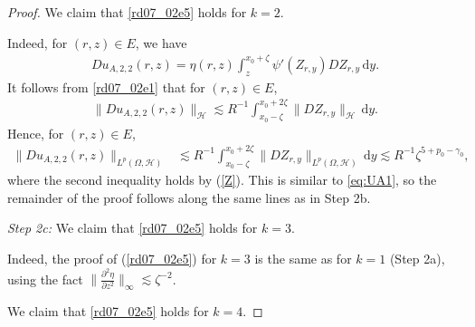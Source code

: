 \documentclass[12pt,a4paper]{article}
\newcommand{\R}{{\mathbb{R}}}
\newcommand{\E}{\mathrm{E}}
\renewcommand{\d}{\mathrm{d}}
\newcommand {\deltah}{{\zeta}}
\newcommand{\<}{\langle}
\renewcommand{\>}{\rangle}
\begin{document}
\begin{proof}
           We claim that \eqref{rd07_02e5} holds for $k=2$.
  
Indeed, for $(r,z)\in E$, we have
           \begin{align*}
           Du_{A,2,2}(r,z) = \eta(r,z) \int_z^{x_0+\deltah} \psi'(Z_{r,y})DZ_{r,y} \, \d y. 
           \end{align*}
           It follows from \eqref{rd07_02e1} that for $(r,z)\in E$,
           \begin{align*}
           \|Du_{A,2,2}(r,z)\|_{\mathcal{H}} \lesssim R^{-1}\int_{x_0-\deltah}^{x_0+2\deltah}\|DZ_{r,y}\|_{\mathcal{H}}\, \d y.
           \end{align*}
           Hence, for $(r,z)\in E$,
           \begin{align*}
           \|Du_{A,2,2}(r,z)\|_{L^p(\Omega,\mathcal{H})}& \lesssim 
           R^{-1}\int_{x_0-\deltah}^{x_0+2\deltah}\|DZ_{r,y}\|_{L^p(\Omega, \mathcal{H})}\, \d y
           \lesssim R^{-1}\deltah^{5+p_0-\gamma_0},
           \end{align*}
           where the second inequality holds by (\ref{Z}). This is similar to \eqref{eq:UA1}, so the remainder of the proof follows along the same lines 
           as in Step 2b.
   \medskip
   
 \noindent
 {\it Step 2c:}
We claim that \eqref{rd07_02e5} holds for $k=3$.
  
 Indeed, the proof of (\ref{rd07_02e5}) for $k=3$ is the same as for $k=1$ (Step 2a), using the fact $\|\frac{\partial^2 \eta}{\partial z^2}\|_\infty\lesssim \deltah^{-2}$.
 
  \medskip
  
           We claim that \eqref{rd07_02e5} holds for $k=4$.


\end{proof}
\end{document}
